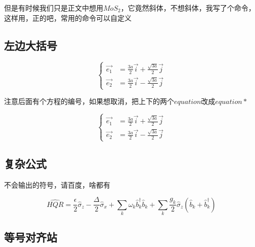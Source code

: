 \documentclass[AutoFakeBold]{LZUThesis2007}
\begin{document}
但是有时候我们只是正文中想用$MoS_2$，它竟然斜体，不想斜体，我写了个命令，这样用，正的吧，常用的命令可以自定义


\subsection{左边大括号} %
\label{sub:左边大括号}

\begin{equation}
    \left\{
    \begin{array}{rcl}
        \vec{e_1} &= \frac{3a}{2} \vec{i} + \frac{\sqrt{3a}}{2} \vec{j} \\
        \vec{e_2} &= \frac{3a}{2} \vec{i} - \frac{\sqrt{3a}}{2} \vec{j}
    \end{array}
    \right.
    \label{e1e2}
\end{equation}

注意后面有个方程的编号，如果想取消，把上下的两个$equation$改成$equation*$

\begin{equation*}
    \left\{
    \begin{array}{rcl}
        \vec{e_1} &= \frac{3a}{2} \vec{i} + \frac{\sqrt{3a}}{2} \vec{j} \\
        \vec{e_2} &= \frac{3a}{2} \vec{i} - \frac{\sqrt{3a}}{2} \vec{j}
    \end{array}
    \right.
    \label{e1e2_2}
\end{equation*}


\subsection{复杂公式} %
\label{sub:复杂公式}
不会输出的符号，请百度，啥都有

\begin{equation}
\hat{HQR}=\frac{\epsilon}{2}\hat{\sigma}_{z}-\frac{\Delta}{2}\hat{\sigma}_{x}+\sum_{k}\omega_{k}\hat{b}_{k}^{\dagger}\hat{b}_{k}+\sum_{k}\frac{g_{k}}{2}\hat{\sigma}_{z}(\hat{b}_{k}+\hat{b}_{k}^{\dagger})\label{eq:sbm}
\end{equation}



\subsection{等号对齐站} %
\label{sub:等号对齐站}
\end{document}
